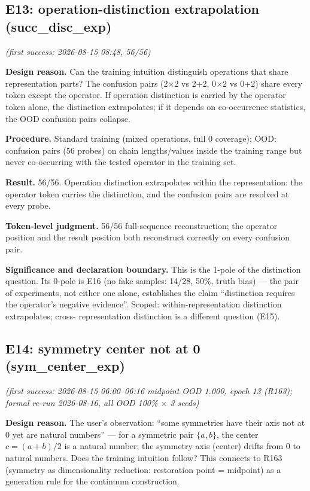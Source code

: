 \documentclass[sigplan,10pt,anonymous,review]{acmart}
\begin{document}
\subsection{E13: operation-distinction extrapolation (succ\_disc\_exp)}\hfill\textit{(first success: 2026-08-15 08:48, 56/56)}

\textbf{Design reason.} Can the training intuition distinguish operations
that share representation parts? The confusion pairs (2$\times$2 vs 2+2,
0$\times$2 vs 0+2) share every token except the operator. If operation
distinction is carried by the operator token alone, the distinction
extrapolates; if it depends on co-occurrence statistics, the OOD
confusion pairs collapse.

\textbf{Procedure.} Standard training (mixed operations, full 0 coverage);
OOD: confusion pairs (56 probes) on chain lengths/values inside the
training range but never co-occurring with the tested operator in the
training set.

\textbf{Result.} 56/56. Operation distinction extrapolates within the
representation: the operator token carries the distinction, and the
confusion pairs are resolved at every probe.

\textbf{Token-level judgment.} 56/56 full-sequence reconstruction; the
operator position and the result position both reconstruct correctly on
every confusion pair.

\textbf{Significance and declaration boundary.} This is the 1-pole of the
distinction question. Its 0-pole is E16 (no fake samples: 14/28, 50\%,
truth bias) --- the pair of experiments, not either one alone, establishes
the claim ``distinction requires the operator's negative evidence''.
Scoped: within-representation distinction extrapolates; cross-
representation distinction is a different question (E15).

\subsection{E14: symmetry center not at 0 (sym\_center\_exp)}\hfill\textit{(first success: 2026-08-15 06:00--06:16 midpoint OOD 1.000, epoch 13 (R163); formal re-run 2026-08-16, all OOD 100\% $\times$ 3 seeds)}

\textbf{Design reason.} The user's observation: ``some symmetries have
their axis not at 0 yet are natural numbers'' --- for a symmetric pair
$\{a,b\}$, the center $c=(a+b)/2$ is a natural number; the symmetry axis
(center) drifts from 0 to natural numbers. Does the training intuition
follow? This connects to R163 (symmetry as dimensionality reduction:
restoration point = midpoint) as a generation rule for the continuum
construction.
\end{document}
